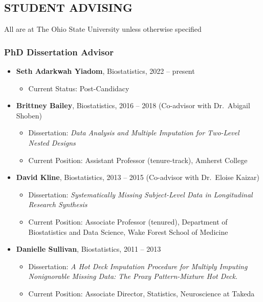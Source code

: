 \documentclass[
  english,
  letterpaper,
  DIV=11,
  numbers=noendperiod]{scrartcl}
\providecommand{\tightlist}{%
  \setlength{\itemsep}{0pt}\setlength{\parskip}{0pt}}
\begin{document}
\subsection{STUDENT ADVISING}\label{student-advising}

All are at The Ohio State University unless otherwise specified

\subsubsection{PhD Dissertation Advisor}\label{phd-dissertation-advisor}

\begin{itemize}
\tightlist
\item
  \textbf{Seth Adarkwah Yiadom}, Biostatistics, 2022 -- present

  \begin{itemize}
  \tightlist
  \item
    Current Status: Post-Candidacy
  \end{itemize}
\item
  \textbf{Brittney Bailey}, Biostatistics, 2016 -- 2018 (Co-advisor with
  Dr.~Abigail Shoben)

  \begin{itemize}
  \tightlist
  \item
    Dissertation: \emph{Data Analysis and Multiple Imputation for
    Two-Level Nested Designs}
  \item
    Current Position: Assistant Professor (tenure-track), Amherst
    College
  \end{itemize}
\item
  \textbf{David Kline}, Biostatistics, 2013 -- 2015 (Co-advisor with
  Dr.~Eloise Kaizar)

  \begin{itemize}
  \tightlist
  \item
    Dissertation: \emph{Systematically Missing Subject-Level Data in
    Longitudinal Research Synthesis}
  \item
    Current Position: Associate Professor (tenured), Department of
    Biostatistics and Data Science, Wake Forest School of Medicine
  \end{itemize}
\item
  \textbf{Danielle Sullivan}, Biostatistics, 2011 -- 2013

  \begin{itemize}
  \tightlist
  \item
    Dissertation: \emph{A Hot Deck Imputation Procedure for Multiply
    Imputing Nonignorable Missing Data: The Proxy Pattern-Mixture Hot
    Deck.}
  \item
    Current Position: Associate Director, Statistics, Neuroscience at
    Takeda
  \end{itemize}
\end{itemize}
\end{document}

